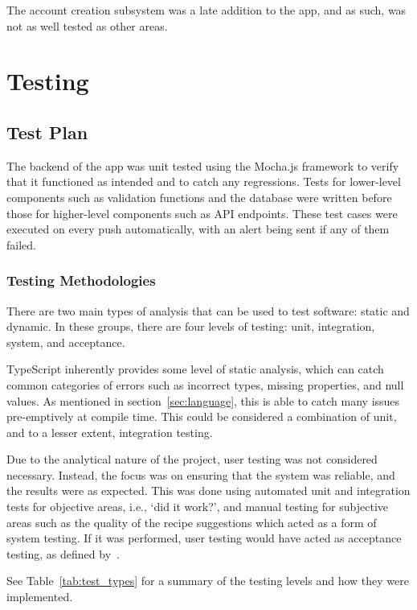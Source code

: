 The account creation subsystem was a late addition to the app, and as such, was not as well tested as other areas.

\section{Testing}

\subsection{Test Plan}
The backend of the app was unit tested using the Mocha.js framework
to verify that it functioned as intended and to catch any regressions. Tests for lower-level components
such as validation functions and the database were written before those for higher-level
components such as API endpoints. These test cases were executed on every push automatically,
with an alert being sent if any of them failed.

\subsubsection{Testing Methodologies}

There are two main types of analysis that can be used to test software: static and dynamic. In these groups, there are
four levels of testing: unit, integration, system, and acceptance.~\cite{luo_software_2001}

TypeScript inherently provides some level of static analysis, which can catch common categories of errors such as
incorrect types, missing properties, and null values. As mentioned in section~\ref{sec:language}, this is able to
catch many issues pre-emptively at compile time. This could be considered a combination of unit, and to a lesser extent,
integration testing.

Due to the analytical nature of the project, user testing was not considered necessary. Instead, the focus was on ensuring
that the system was reliable, and the results were as expected. This was done using automated unit and integration tests for
objective areas, i.e., \enquote*{did it work?}, and manual testing for subjective areas such as the quality of the recipe
suggestions which acted as a form of system testing. If it was performed, user testing would have acted as acceptance testing,
as defined by~\cite{luo_software_2001}.

See Table~\ref{tab:test_types} for a summary of the testing levels and how they were implemented.

